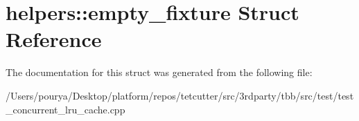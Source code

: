 \hypertarget{structhelpers_1_1empty__fixture}{}\section{helpers\+:\+:empty\+\_\+fixture Struct Reference}
\label{structhelpers_1_1empty__fixture}


The documentation for this struct was generated from the following file\+:\begin{DoxyCompactItemize}
\item 
/\+Users/pourya/\+Desktop/platform/repos/tetcutter/src/3rdparty/tbb/src/test/test\+\_\+concurrent\+\_\+lru\+\_\+cache.\+cpp\end{DoxyCompactItemize}
